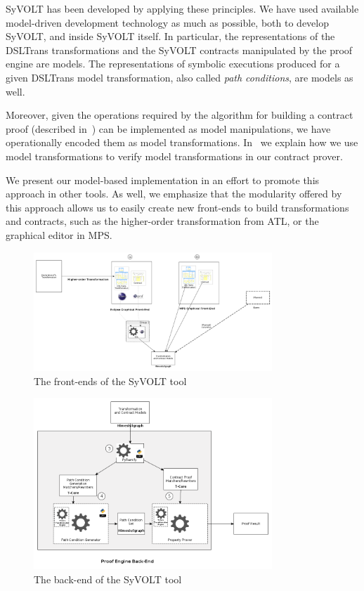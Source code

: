 SyVOLT has been developed by applying these principles. We have used available
model-driven development technology as much as possible, both to develop SyVOLT,
and inside SyVOLT itself. In particular, the representations of the DSLTrans
transformations and the SyVOLT contracts manipulated by the proof engine are
models. The representations of symbolic executions produced for a given DSLTrans
model transformation, also called \emph{path conditions}, are models as well.

Moreover, given the operations required by the algorithm for building a contract
proof (described in~\cite{Lucio2014}) can be implemented as model manipulations,
we have operationally encoded them as model transformations.
In~\cite{LucioVang} we explain how we use model transformations to
verify model transformations in our contract prover.

We present our model-based implementation in an effort to promote this approach in other tools. As well, we emphasize that the modularity offered by this approach allows us to easily create new front-ends to build transformations and contracts, such as the higher-order transformation from ATL, or the graphical editor in MPS.

\begin{figure}
\centering
\includegraphics[width=0.8\textwidth]{figures/syvolt_prover/syvolt_frontend}
\caption{The front-ends of the SyVOLT tool}
\label{fig:frontend}
\end{figure}

\begin{figure}
\centering
\includegraphics[width=0.8\textwidth]{figures/syvolt_prover/syvolt_backend}
\caption{The back-end of the SyVOLT tool}
\label{fig:backend}
\end{figure}


